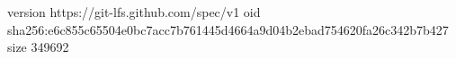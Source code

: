 version https://git-lfs.github.com/spec/v1
oid sha256:e6c855c65504e0bc7acc7b761445d4664a9d04b2ebad754620fa26c342b7b427
size 349692
